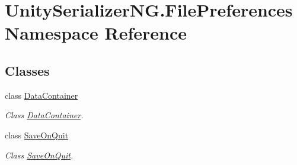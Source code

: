 \hypertarget{namespace_unity_serializer_n_g_1_1_file_preferences}{}\section{Unity\+Serializer\+N\+G.\+File\+Preferences Namespace Reference}
\label{namespace_unity_serializer_n_g_1_1_file_preferences}
\subsection*{Classes}
\begin{DoxyCompactItemize}
\item 
class \hyperlink{class_unity_serializer_n_g_1_1_file_preferences_1_1_data_container}{Data\+Container}
\begin{DoxyCompactList}\small\item\em Class \hyperlink{class_unity_serializer_n_g_1_1_file_preferences_1_1_data_container}{Data\+Container}. \end{DoxyCompactList}\item 
class \hyperlink{class_unity_serializer_n_g_1_1_file_preferences_1_1_save_on_quit}{Save\+On\+Quit}
\begin{DoxyCompactList}\small\item\em Class \hyperlink{class_unity_serializer_n_g_1_1_file_preferences_1_1_save_on_quit}{Save\+On\+Quit}. \end{DoxyCompactList}\end{DoxyCompactItemize}
